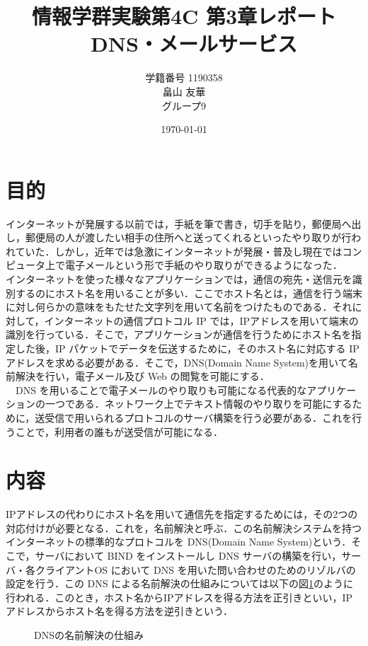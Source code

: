 \documentclass[a4j,titlepage]{jarticle}
\title{情報学群実験第4C 第3章レポート\\　DNS・メールサービス}
\author{学籍番号 1190358\\
        畠山 友華\\
        グループ9}
\date{\today}
\begin{document}
\maketitle
\section{目的}
インターネットが発展する以前では，手紙を筆で書き，切手を貼り，郵便局へ出し，郵便局の人が渡したい相手の住所へと送ってくれるといったやり取りが行われていた．しかし，近年では急激にインターネットが発展・普及し現在ではコンピュータ上で電子メールという形で手紙のやり取りができるようになった．\\
インターネットを使った様々なアプリケーションでは，通信の宛先・送信元を識別するのにホスト名を用いることが多い．ここでホスト名とは，通信を行う端末に対し何らかの意味をもたせた文字列を用いて名前をつけたものである．それに対して，インターネットの通信プロトコル IP では，IPアドレスを用いて端末の識別を行っている．そこで，アプリケーションが通信を行うためにホスト名を指定した後，IP パケットでデータを伝送するために，そのホスト名に対応する IPアドレスを求める必要がある．そこで，DNS(Domain Name System)を用いて名前解決を行い，電子メール及び Web の閲覧を可能にする．\\
　DNS を用いることで電子メールのやり取りも可能になる代表的なアプリケーションの一つである．ネットワーク上でテキスト情報のやり取りを可能にするために，送受信で用いられるプロトコルのサーバ構築を行う必要がある．これを行うことで，利用者の誰もが送受信が可能になる．


\section{内容}
IPアドレスの代わりにホスト名を用いて通信先を指定するためには，その2つの対応付けが必要となる．これを，名前解決と呼ぶ．この名前解決システムを持つインターネットの標準的なプロトコルを DNS(Domain Name System)という．そこで，サーバにおいて BIND をインストールし DNS サーバの構築を行い，サーバ・各クライアントOS において DNS を用いた問い合わせのためのリゾルバの設定を行う．この DNS による名前解決の仕組みについては以下の図\ref{fig:dns2}のように行われる．このとき，ホスト名からIPアドレスを得る方法を正引きといい，IPアドレスからホスト名を得る方法を逆引きという．\\

  \begin{figure}[htbp]
    \begin{center}
      \caption{DNSの名前解決の仕組み}
     \label{fig:dns2}
   \end{center}
  \end{figure}
\end{document}
